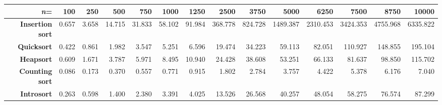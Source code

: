 \begin{tabular}{rrrrrrrrrrrrrr}
\hline
                   \textbf{\emph{n}=}      &   \textbf{100} &   \textbf{250} &   \textbf{500} &   \textbf{750} &   \textbf{1000} &   \textbf{1250} &   \textbf{2500} &   \textbf{3750} &   \textbf{5000} &   \textbf{6250} &   \textbf{7500} &   \textbf{8750} &   \textbf{10000} \\
\hline
 \textbf{Insertion sort} &          0.657 &          3.658 &         14.715 &         31.833 &          58.102 &          91.984 &         368.778 &         824.728 &        1489.387 &        2310.453 &        3424.353 &        4755.968 &         6335.822 \\
      \textbf{Quicksort} &          0.422 &          0.861 &          1.982 &          3.547 &           5.251 &           6.596 &          19.474 &          34.223 &          59.113 &          82.051 &         110.927 &         148.855 &          195.104 \\
       \textbf{Heapsort} &          0.609 &          1.671 &          3.787 &          5.971 &           8.495 &          10.940 &          24.428 &          38.608 &          53.251 &          66.133 &          81.637 &          98.850 &          115.702 \\
  \textbf{Counting sort} &          0.086 &          0.173 &          0.370 &          0.557 &           0.771 &           0.915 &           1.802 &           2.784 &           3.757 &           4.422 &           5.378 &           6.176 &            7.040 \\
      \textbf{Introsort} &          0.263 &          0.598 &          1.400 &          2.380 &           3.391 &           4.025 &          13.526 &          26.568 &          40.257 &          48.054 &          58.275 &          76.574 &           87.299 \\
\hline
\end{tabular}